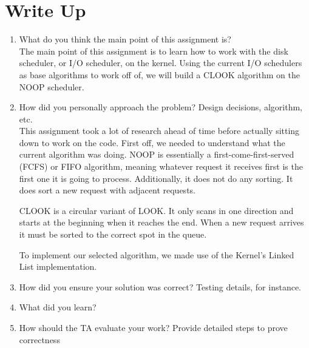 \documentclass[letterpaper,10pt,draftclsnofoot,onecolumn,titlepage]{IEEEtran}
\begin{document}
\section{Write Up}
\begin{enumerate}
                \item What do you think the main point of this assignment is? \\
The main point of this assignment is to learn how to work with the disk scheduler, or I/O scheduler, on the kernel. 
Using the current I/O schedulers as base algorithms to work off of, we will build a CLOOK algorithm on the NOOP scheduler. 
                \item How did you personally approach the problem? Design decisions, algorithm, etc. \\
This assignment took a lot of research ahead of time before actually sitting down to work on the code. 
First off, we needed to understand what the current algorithm was doing. 
NOOP is essentially a first-come-first-served (FCFS) or FIFO algorithm, meaning whatever request it receives first is the first one it is going to process. 
Additionally, it does not do any sorting. It does sort a new request with adjacent requests. 

CLOOK is a circular variant of LOOK. It only scans in one direction and starts at the beginning when it reaches the end. When a new request arrives it must 
be sorted to the correct spot in the queue.

To implement our selected algorithm, we made use of the Kernel's Linked List implementation. 
                \item How did you ensure your solution was correct? Testing details, for instance.
                \item What did you learn?
                \item How should the TA evaluate your work? Provide detailed steps to prove correctness 
\end{enumerate}
\end{document}
